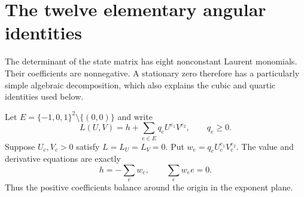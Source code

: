 \section{The twelve elementary angular identities}
\label{sec:angular-circuits}

The determinant of the state matrix has eight nonconstant Laurent
monomials. Their coefficients are nonnegative. A stationary zero
therefore has a particularly simple algebraic decomposition, which
also explains the cubic and quartic identities used below.

Let $E=\{-1,0,1\}^2\setminus\{(0,0)\}$ and write
\[
 L(U,V)=h+\sum_{e\in E}q_eU^{e_1}V^{e_2},\qquad q_e\ge0.
\]
Suppose $U_c,V_c>0$ satisfy $L=L_U=L_V=0$. Put
$w_e=q_eU_c^{e_1}V_c^{e_2}$. The value and derivative equations are
exactly
\[
 h=-\sum_e w_e,\qquad \sum_e w_e e=0.
 \label{eq:angular-balance}
\]
Thus the positive coefficients balance around the origin in the
exponent plane.

